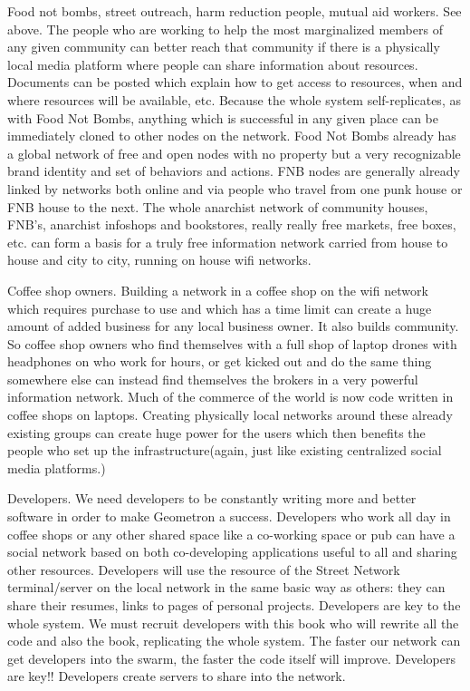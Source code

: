 Food not bombs, street outreach, harm reduction people, mutual aid workers.  See above.  The people who are working to help the most marginalized members of any given community can better reach that community if there is a physically local media platform where people can share information about resources.  Documents can be posted which explain how to get access to resources, when and where resources will be available, etc.  Because the whole system self-replicates, as with Food Not Bombs, anything which is successful in any given place can be immediately cloned to other nodes on the network.  Food Not Bombs already has a global network of free and open nodes with no property but a very recognizable brand identity and set of behaviors and actions.  FNB nodes are generally already linked by networks both online and via people who travel from one punk house or FNB house to the next.  The whole anarchist network of community houses, FNB's, anarchist infoshops and bookstores, really really free markets, free boxes, etc. can form a basis for a truly free information network carried from house to house and city to city, running on house wifi networks.  

Coffee shop owners.  Building a network in a coffee shop on the wifi network which requires purchase to use and which has a time limit can create a huge amount of added business for any local business owner.  It also builds community. So coffee shop owners who find themselves with a full shop of laptop drones with headphones on who work for hours, or get kicked out and do the same thing somewhere else can instead find themselves the brokers in a very powerful information network.  Much of the commerce of the world is now code written in coffee shops on laptops.  Creating physically local networks around these already existing groups can create huge power for the users which then benefits the people who set up the infrastructure(again, just like existing centralized social media platforms.)

Developers.  We need developers to be constantly writing more and better software in order to make Geometron a success. Developers who work all day in coffee shops or any other shared space like a co-working space or pub can have a social network based on both co-developing applications useful to all and sharing other resources.  Developers will use the resource of the Street Network terminal/server on the local network in the same basic way as others: they can share their resumes, links to pages of personal projects.  Developers are key to the whole system. We must recruit developers with this book who will rewrite all the code and also the book, replicating the whole system.  The faster our network can get developers into the swarm, the faster the code itself will improve.  Developers are key!!  Developers create servers to share into the network.  

